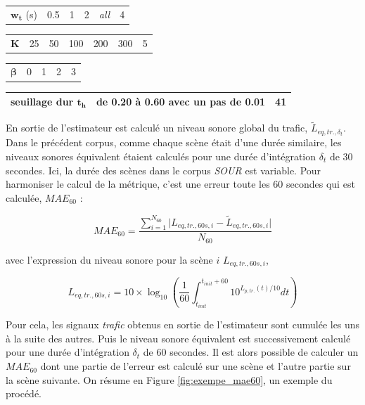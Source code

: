 \begin{table}[t]
\begin{tabularx}{17.5cm}{L{3cm}@{}C{3cm}@{}@{}C{3cm}@{}@{}C{3cm}@{}@{}C{3cm}@{}C{2cm}@{}}
    $\mathbf{w_t}$ (s)& 0.5 & 1 & 2 & \textit{all} & 4\\
\end{tabularx}

\begin{tabularx}{17.5cm}{L{3cm}@{}C{2.4cm}@{}@{}C{2.4cm}@{}@{}C{2.4cm}@{}@{}C{2.4cm}@{}@{}C{2.4cm}@{}C{2cm}@{}}
    $\mathbf{K}$ & 25 & 50 & 100 & 200 & 300 & 5\\
\end{tabularx}

\begin{tabularx}{17.5cm}{L{3cm}@{}C{4cm}@{}@{}C{4cm}@{}@{}C{4cm}@{}C{2cm}@{}}
   $\mathbf{\beta}$ & 0 & 1 & 2 & 3\\
\end{tabularx}

\begin{tabularx}{17.5cm}{L{3cm}@{}C{12cm}@{}C{2cm}@{}}
   seuillage dur $\mathbf{t_h}$ & de 0.20 à 0.60 avec un pas de 0.01 & 41\\
   \bottomrule
\end{tabularx}
\label{tab:experimental_factorsNMF}
\end{table}

 
En sortie de l'estimateur est calculé un niveau sonore global du trafic, $\tilde{L}_{eq,tr.,\delta_t}$. Dans le précédent corpus, comme chaque scène était d'une durée similaire, les niveaux sonores équivalent étaient calculés pour une durée d'intégration $\delta_t$ de 30 secondes. Ici, la durée des scènes dans le corpus \textit{SOUR} est variable. Pour harmoniser le calcul de la métrique, c'est une erreur toute les 60 secondes qui est calculée, $MAE_{60}$ : 

\begin{equation}
MAE_{60} = \frac{\sum_{i = 1}^{N_{60}}\vert L_{eq,tr.,60s, i} - \tilde{L}_{eq,tr.,60s, i}\vert}{N_{60}}
\end{equation}

avec l'expression du niveau sonore pour la scène $i$ $L_{eq,tr.,60s, i}$,  

\begin{equation}
L_{eq,tr.,60s, i} = 10 \times \log_{10}\left(\frac{1}{60}\int_{t_{init}}^{t_{init}+60} 10^{L_{p,tr.}(t)/10} dt\right)
\end{equation}

Pour cela, les signaux \textit{trafic} obtenus en sortie de l'estimateur sont cumulée les uns à la suite des autres. Puis le niveau sonore équivalent est successivement calculé pour une durée d'intégration $\delta_t$ de 60 secondes. Il est alors possible de calculer un $MAE_{60}$ dont une partie de l'erreur est calculé sur une scène et l'autre partie sur la scène suivante. On résume en Figure \ref{fig:exempe_mae60}, un exemple du procédé. 

